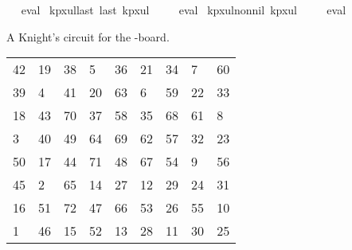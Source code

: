 \begin{isabellebody}
\isadelimproof
\ %
\endisadelimproof
%
\isatagproof
{}\isamarkupfalse%
\ eval%
\endisatagproof
{\isafoldproof}%
%
\isadelimproof
%
\endisadelimproof
\isanewline
\isanewline
{}\isamarkupfalse%
\ kp{\isacharunderscore}{\kern0pt}{}x{}{\isacharunderscore}{\kern0pt}ul{\isacharunderscore}{\kern0pt}last{\isacharcolon}{\kern0pt}\ {\isachardoublequoteopen}last\ kp{}x{}ul\ {\isacharequal}{\kern0pt}\ {\isacharparenleft}{\kern0pt}{}{\isacharcomma}{\kern0pt}{}{\isacharparenright}{\kern0pt}{\isachardoublequoteclose}%
\isadelimproof
\ %
\endisadelimproof
%
\isatagproof
{}\isamarkupfalse%
\ eval%
\endisatagproof
{\isafoldproof}%
%
\isadelimproof
%
\endisadelimproof
\isanewline
\isanewline
{}\isamarkupfalse%
\ kp{\isacharunderscore}{\kern0pt}{}x{}{\isacharunderscore}{\kern0pt}ul{\isacharunderscore}{\kern0pt}non{\isacharunderscore}{\kern0pt}nil{\isacharcolon}{\kern0pt}\ {\isachardoublequoteopen}kp{}x{}ul\ {\isasymnoteq}\ {\isacharbrackleft}{\kern0pt}{\isacharbrackright}{\kern0pt}{\isachardoublequoteclose}%
\isadelimproof
\ %
\endisadelimproof
%
\isatagproof
{}\isamarkupfalse%
\ eval%
\endisatagproof
{\isafoldproof}%
%
\isadelimproof
%
\endisadelimproof
%
\begin{isamarkuptext}%
A Knight's circuit for the -board.
  \begin{table}[H]
    \begin{tabular}{lllllllll}
      42 & 19 & 38 &  5 & 36 & 21 & 34 &  7 & 60 \\
      39 &  4 & 41 & 20 & 63 &  6 & 59 & 22 & 33 \\
      18 & 43 & 70 & 37 & 58 & 35 & 68 & 61 &  8 \\
       3 & 40 & 49 & 64 & 69 & 62 & 57 & 32 & 23 \\
      50 & 17 & 44 & 71 & 48 & 67 & 54 &  9 & 56 \\
      45 &  2 & 65 & 14 & 27 & 12 & 29 & 24 & 31 \\
      16 & 51 & 72 & 47 & 66 & 53 & 26 & 55 & 10 \\
       1 & 46 & 15 & 52 & 13 & 28 & 11 & 30 & 25
    \end{tabular}
  \end{table}%
\end{isamarkuptext}\isamarkuptrue%
\isamarkupfalse%

\end{isabellebody}
